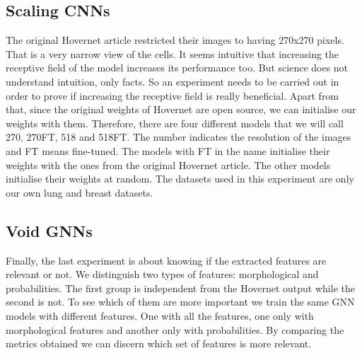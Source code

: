 \subsection{Scaling CNNs}

The original Hovernet article restricted their images to having 270x270 pixels. That is a very narrow view of the cells. It seems intuitive that increasing the receptive field of the model increases its performance too. But science does not understand intuition, only facts. So an experiment needs to be carried out in order to prove if increasing the receptive field is really beneficial. Apart from that, since the original weights of Hovernet are open source, we can initialise our weights with them. Therefore, there are four different models that we will call 270, 270FT, 518 and 518FT. The number indicates the resolution of the images and FT means fine-tuned. The models with FT in the name initialise their weights with the ones from the original Hovernet article. The other models initialise their weights at random. The datasets used in this experiment are only our own lung and breast datasets.

\subsection{Void GNNs}

Finally, the last experiment is about knowing if the extracted features are relevant or not. We distinguish two types of features: morphological and probabilities. The first group is independent from the Hovernet output while the second is not. To see which of them are more important we train the same GNN models with different features. One with all the features, one only with morphological features and another only with probabilities. By comparing the metrics obtained we can discern which set of features is more relevant.
